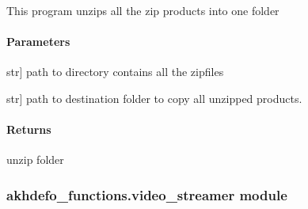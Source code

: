 \documentclass[letterpaper,10pt,english]{sphinxmanual}
\begin{document}

\begin{fulllineitems}
\label{\detokenize{akhdefo_functions:akhdefo_functions.Unzip_CopyFiles.unzip}}
\pysigstartsignatures
{}
\pysigstopsignatures
\sphinxAtStartPar
This program unzips all the zip products into one folder


\paragraph{Parameters}
\label{\detokenize{akhdefo_functions:id45}}\begin{description}
\sphinxlineitem{zipdir}{[}str{]}
\sphinxAtStartPar
path to directory contains all the zipfiles

\sphinxlineitem{dst\_dir}{[}str{]}
\sphinxAtStartPar
path to destination folder to copy all unzipped products.

\end{description}


\paragraph{Returns}
\label{\detokenize{akhdefo_functions:id46}}
\sphinxAtStartPar
unzip folder

\end{fulllineitems}



\subsubsection{akhdefo\_functions.video\_streamer module}
\label{\detokenize{akhdefo_functions:module-akhdefo_functions.video_streamer}}\label{\detokenize{akhdefo_functions:akhdefo-functions-video-streamer-module}}
\end{document}
